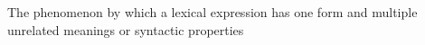 The phenomenon by which a lexical expression has one form and multiple unrelated meanings or syntactic properties
